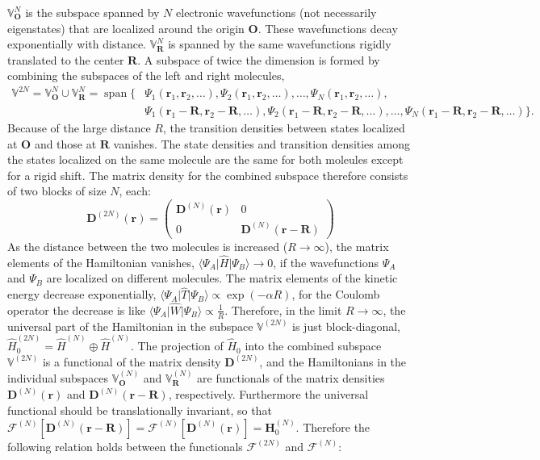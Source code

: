 \documentclass[journal=jacsat,manuscript=article]{achemso}
\DeclareMathOperator{\Span}{span}
\newcommand\m[1]{\mathbf{#1}}
\renewcommand\vec[1]{\mathbf{#1}}
\begin{document}
$\mathbb{V}_{\vec{O}}^N$ is the subspace spanned by $N$ electronic wavefunctions (not necessarily eigenstates) that are localized around the origin $\vec{O}$. These wavefunctions decay exponentially with distance. $\mathbb{V}_{\vec{R}}^N$ is spanned by the same wavefunctions rigidly translated to the center $\vec{R}$. A subspace of twice the dimension is formed by combining the subspaces of the left and right molecules,
\begin{equation}
  \begin{split}
    \mathbb{V}^{2N} = \mathbb{V}^{N}_{\vec{O}} \cup \mathbb{V}^{N}_{\vec{R}} = \Span\Big\{ &
                  \Psi_1(\vec{r}_1,\vec{r}_2,\ldots),
                  \Psi_2(\vec{r}_1,\vec{r}_2,\ldots), \ldots,
                  \Psi_N(\vec{r}_1,\vec{r}_2,\ldots), \\
    &             \Psi_1(\vec{r}_1-\vec{R},\vec{r}_2-\vec{R},\ldots),
                  \Psi_2(\vec{r}_1-\vec{R},\vec{r}_2-\vec{R},\ldots), \ldots,
                  \Psi_N(\vec{r}_1-\vec{R},\vec{r}_2-\vec{R},\ldots) \Big\}.
  \end{split}
\end{equation}
Because of the large distance $R$, the transition densities between states localized at $\vec{O}$ and those at $\vec{R}$ vanishes. The state densities and transition densities among the states localized on the same molecule are the same for both moleules except for a rigid shift. The matrix density for the combined subspace therefore consists of two blocks of size $N$, each:
\begin{equation}
  \m{D}^{(2N)}(\vec{r}) =
  \begin{pmatrix}
    \m{D}^{(N)}(\vec{r}) & 0 \\
    0 & \m{D}^{(N)}(\vec{r}-\vec{R})
  \end{pmatrix}
\end{equation}
As the distance between the two molecules is increased ($R \to \infty$), the matrix elements of the Hamiltonian vanishes, $\langle \Psi_{A} \vert \hat{H} \vert \Psi_{B} \rangle \to 0$, if the wavefunctions $\Psi_A$ and $\Psi_B$ are localized on different molecules. The matrix elements of the kinetic energy decrease exponentially, $\langle \Psi_{A} \vert \hat{T} \vert \Psi_{B} \rangle \propto \exp(-\alpha R)$, for the Coulomb operator the decrease is like $\langle \Psi_{A} \vert \hat{W} \vert \Psi_{B} \rangle \propto \frac{1}{R}$.
Therefore, in the limit $R \to \infty$, the universal part of the Hamiltonian in the subspace $\mathbb{V}^{(2 N)}$ is just block-diagonal, $\hat{H}^{(2N)}_0 = \hat{H}^{(N)} \oplus \hat{H}^{(N)}$. The projection of $\hat{H}_0$ into the combined subspace $\mathbb{V}^{(2N)}$ is a functional of the matrix density $\m{D}^{(2N)}$, and the Hamiltonians in the individual subspaces $\mathbb{V}^{(N)}_{\vec{O}}$ and $\mathbb{V}^{(N)}_{\vec{R}}$ are functionals of the matrix densities $\m{D}^{(N)}(\vec{r})$ and $\m{D}^{(N)}(\vec{r}-\vec{R})$, respectively. Furthermore the universal functional should be translationally invariant, so that $\mathcal{F}^{(N)}[\m{D}^{(N)}(\vec{r}-\vec{R})] = \mathcal{F}^{(N)}[\m{D}^{(N)}(\vec{r})] = \m{H}^{(N)}_0$. Therefore the following relation holds between the functionals $\mathcal{F}^{(2N)}$ and $\mathcal{F}^{(N)}$:
\end{document}
